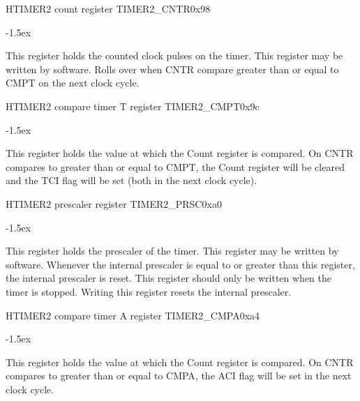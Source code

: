\documentclass[12pt]{article}
\begin{document}
\begin{register}{H}{TIMER2 count register TIMER2\_CNTR}{0x98}
\label{timer2cntr}
%
%
\regnewline%
\end{register}
\begin{regdesc}[0.8\textwidth]\begin{reglist}[00000]
\itemsep-1.5ex
\item[CNTR] This register holds the counted clock pulses on the timer. This register may be written by software. Rolls over when CNTR compare greater than or equal to CMPT on the next clock cycle.
\end{reglist}\end{regdesc}

\begin{register}{H}{TIMER2 compare timer T register TIMER2\_CMPT}{0x9c}
\label{timer2cmpt}
%
%
\regnewline%
\end{register}
\begin{regdesc}[0.8\textwidth]\begin{reglist}[00000]
\itemsep-1.5ex
\item[CMPT] This register holds the value at which the Count register is compared. On CNTR compares to greater than or equal to CMPT, the Count register will be cleared and the TCI flag will be set (both in the next clock cycle).
\end{reglist}\end{regdesc}

\begin{register}{H}{TIMER2 prescaler register TIMER2\_PRSC}{0xa0}
\label{timer2prsc}
%
%
\regnewline%
\end{register}
\begin{regdesc}[0.8\textwidth]\begin{reglist}[00000]
\itemsep-1.5ex
\item[PRSC] This register holds the prescaler of the timer. This register may be written by software. Whenever the internal prescaler is equal to or greater than this register, the internal prescaler is reset. This register should only be written when the timer is stopped. Writing this register resets the internal prescaler.
\end{reglist}\end{regdesc}

\begin{register}{H}{TIMER2 compare timer A register TIMER2\_CMPA}{0xa4}
\label{timer2cmpa}
%
%
\regnewline%
\end{register}
\begin{regdesc}[0.8\textwidth]\begin{reglist}[00000]
\itemsep-1.5ex
\item[CMPA] This register holds the value at which the Count register is compared. On CNTR compares to greater than or equal to CMPA, the ACI flag will be set in the next clock cycle.
\end{reglist}\end{regdesc}
\end{document}
